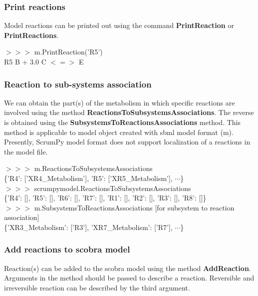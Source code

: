
\subsubsection{Print reactions}
Model reactions can be printed out using the command \textbf{PrintReaction} or \textbf{PrintReactions}.

\begin{framed}
$>>>$ m.PrintReaction('R5')\\ 
R5 \space B + 3.0 C $<=>$ E
\end{framed}


\subsubsection{Reaction to sub-systems association}
We can obtain the part(s) of the metabolism in which specific reactions are involved using the method \textbf{ReactionsToSubsystemsAssociations}. The reverse is obtained using the \textbf{SubsystemsToReactionsAssociations} method. This method is applicable to model object created with sbml model format (m). Presently, ScrumPy model format does not support localization of a reactions in the model file.

\begin{framed}
$>>>$ m.ReactionsToSubsystemsAssociations\\
\{'R4': ['XR4\_Metabolism'], 'R5': ['XR5\_Metabolism'], $\cdots$\}\\

$>>>$ scrumpymodel.ReactionsToSubsystemsAssociations\\
\{'R4': [], 'R5': [], 'R6': [], 'R7': [], 'R1': [], 'R2': [], 'R3': [], 'R8': []\}\\

$>>>$ m.SubsystemsToReactionsAssociations [for subsystem to reaction association]\\
\{'XR3\_Metabolism': ['R3'], 'XR7\_Metabolism': ['R7'], $\cdots$\}
\end{framed}


\subsubsection{Add reactions to scobra model}
Reaction(s) can be added to the scobra model using the method \textbf{AddReaction}. Arguments in the method should be passed to describe a reaction. Reversible and irreversible reaction can be described by the third argument. \\


